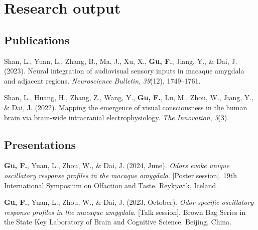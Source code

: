 \documentclass[11pt,a4paper,]{awesome-cv}
\newlength{\cslhangindent}
\newenvironment{CSLReferences}[2] %
 {\begin{list}{}{%
  \setlength{\itemindent}{0pt}
  \setlength{\leftmargin}{0pt}
  \setlength{\parsep}{0pt}
  \ifodd #1
   \setlength{\leftmargin}{\cslhangindent}
   \setlength{\itemindent}{-1\cslhangindent}
  \fi
  \setlength{\itemsep}{#2\baselineskip}}}
 {\end{list}}
\begin{document}
\section{Research output}\label{research-output}

\subsection{Publications}\label{publications}

\label{refs-53a763a6c504681c74a56434e1adcb5a}
\begin{CSLReferences}{1}{0}
Shan, L., Yuan, L., Zhang, B., Ma, J., Xu, X., \textbf{Gu, F.}, Jiang,
Y., \& Dai, J. (2023). Neural integration of audiovisual sensory inputs
in macaque amygdala and adjacent regions. \emph{Neuroscience Bulletin},
\emph{39}(12), 1749--1761.

Shan, L., Huang, H., Zhang, Z., Wang, Y., \textbf{Gu, F.}, Lu, M., Zhou,
W., Jiang, Y., \& Dai, J. (2022). Mapping the emergence of visual
consciousness in the human brain via brain-wide intracranial
electrophysiology. \emph{The Innovation}, \emph{3}(3).

\end{CSLReferences}

\subsection{Presentations}\label{presentations}

\label{refs-bedb83c9dbb4110b3d3a37d9a353fab1}
\begin{CSLReferences}{1}{0}
\textbf{Gu, F.}, Yuan, L., Zhou, W., \& Dai, J. (2024, June).
\emph{Odors evoke unique oscillatory response profiles in the macaque
amygdala}. {[}Poster session{]}. 19th International Symposium on
Olfaction and Taste. Reykjavik, Iceland.

\textbf{Gu, F.}, Yuan, L., Zhou, W., \& Dai, J. (2023, October).
\emph{Odor-specific oscillatory response profiles in the macaque
amygdala}. {[}Talk session{]}. Brown Bag Series in the State Key
Laboratory of Brain and Cognitive Science. Beijing, China.

\end{CSLReferences}
\end{document}
